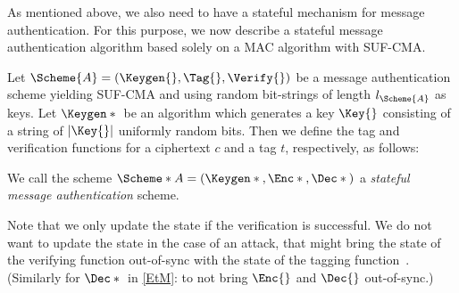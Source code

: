 As mentioned above, we also need to have a stateful mechanism for message 
authentication.
For this purpose, we now describe a stateful message authentication algorithm 
based solely on a \ac{MAC} algorithm with \ac{SUF-CMA}.

\begin{definition}
  Let \(\Scheme{A} = (\Keygen{}, \Tag{}, \Verify{})\) be a message 
  authentication scheme yielding \ac{SUF-CMA} and using random bit-strings of 
  length \(l_{\Scheme{A}}\) as keys.
  Let \(\Keygen*{}\) be an algorithm which generates a key \(\Key{}\) 
  consisting of a string of \(|\Key{}|\) uniformly random bits.
  Then we define the tag and verification functions for a ciphertext \(c\) and 
  a tag \(t\), respectively, as follows:
  \begin{center}
    \normalfont{}
    \begin{minipage}[t]{0.4\textwidth}
      \begin{algorithmic}
            \State{\Return{$\bot$}}
          \EndIf{}
        \EndFunction{}
      \end{algorithmic}
    \end{minipage}%
    \vline%
    \begin{minipage}[t]{0.4\textwidth}
      \begin{algorithmic}
            \State{\Return{$\bot$}}
          \EndIf{}
          \EndIf{}
        \EndFunction{}
      \end{algorithmic}
    \end{minipage}
  \end{center}
  We call the scheme \(\Scheme*{A} = (\Keygen*{}, \Enc*{}, \Dec*{})\) 
  a \emph{stateful message authentication} scheme.
\end{definition}

Note that we only update the state if the verification is successful.
We do not want to update the state in the case of an attack, that might bring 
the state of the verifying function out-of-sync with the state of the tagging 
function~\cite{StatefulDecryption}.
(Similarly for \(\Dec*{}\) in \cref{EtM}: to not bring \(\Enc{}\) and 
\(\Dec{}\) out-of-sync.)

